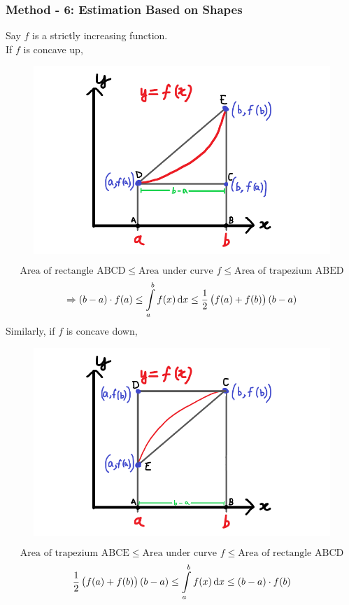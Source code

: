 \documentclass[14]{article}
\theoremstyle{definition}
\theoremstyle{case}
\begin{document}
\subsubsection{Method - 6: Estimation Based on Shapes}
Say $f$ is a strictly increasing function.\\
If $f$ is concave up,
\begin{figure}[h]
\includegraphics[scale=.5]{images/shape_estimation_1}
\end{figure}
\[\text{Area of rectangle ABCD} \leq \text{Area under curve } f \leq \text{Area of trapezium ABED}\]
\[\Rightarrow (b-a)\cdot f(a) \leq \int\limits_a^b f(x) \dif x \leq \dfrac12 \left( f(a) + f(b) \right)(b-a)\]
Similarly, if $f$ is concave down,
\begin{figure}[h]
\includegraphics[scale=.5]{images/shape_estimation_2}
\end{figure}
\[\text{Area of trapezium ABCE} \leq \text{Area under curve } f \leq \text{Area of rectangle ABCD}\]
\[\dfrac12 \left( f(a) + f(b) \right)(b-a) \leq \int\limits_a^b f(x) \dif x \leq (b-a) \cdot f(b)\]
\end{document}
